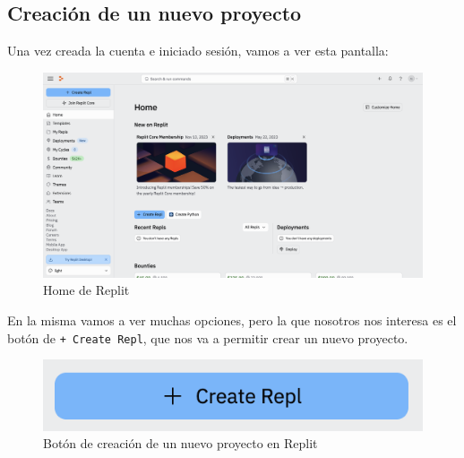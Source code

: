 \documentclass[
  letterpaper,
  DIV=11,
  numbers=noendperiod]{scrreprt}
\begin{document}
\hypertarget{creaciuxf3n-de-un-nuevo-proyecto}{%
\subsection{Creación de un nuevo
proyecto}\label{creaciuxf3n-de-un-nuevo-proyecto}}

Una vez creada la cuenta e iniciado sesión, vamos a ver esta pantalla:

\begin{figure}

{\centering \includegraphics{./imgs/unidad_1/replit_home.png}

}

\caption{Home de Replit}

\end{figure}

En la misma vamos a ver muchas opciones, pero la que nosotros nos
interesa es el botón de \texttt{+\ Create\ Repl}, que nos va a permitir
crear un nuevo proyecto.

\begin{figure}

{\centering \includegraphics{./imgs/unidad_1/replit_create_repl.png}

}

\caption{Botón de creación de un nuevo proyecto en Replit}

\end{figure}
\end{document}
